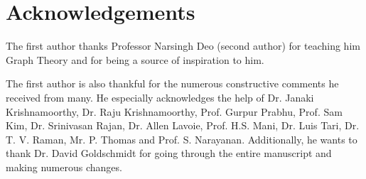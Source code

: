\chapter*{Acknowledgements}
The first author thanks Professor Narsingh Deo (second author) for teaching him Graph Theory and for being a source of inspiration to him.

The first author is also thankful for the numerous constructive comments he received from many. He especially acknowledges the help of Dr. Janaki Krishnamoorthy, Dr. Raju Krishnamoorthy, Prof. Gurpur Prabhu, Prof. Sam Kim, Dr. Srinivasan Rajan, Dr. Allen Lavoie, Prof. H.S. Mani, Dr. Luis Tari, Dr. T. V. Raman, Mr. P. Thomas and Prof. S. Narayanan. Additionally, he wants to thank Dr. David Goldschmidt for going through the entire manuscript and making numerous changes.


